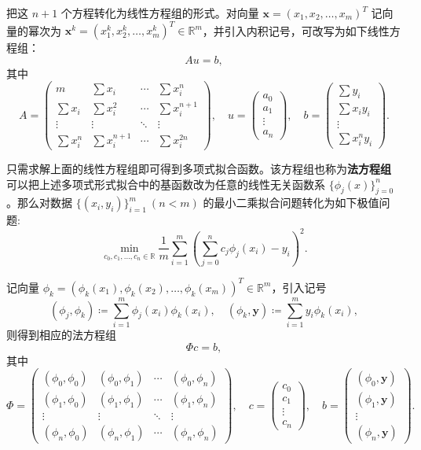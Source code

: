 \documentclass{article}
\begin{document}
把这 \(n + 1\) 个方程转化为线性方程组的形式。对向量 \(\bm{x} = (x_{1},x_{2},\dots ,x_{m})^{T}\) 记向量的幂次为 \(\bm{x}^{k} = (x_{1}^{k},x_{2}^{k},\dots ,x_{m}^{k})^{T}\in \mathbb{R}^{m}\)，并引入内积记号，可改写为如下线性方程组：
\[
A u = b,
\]
其中
\[
A = \begin{pmatrix}
m & \sum x_{i} & \cdots & \sum x_{i}^{n} \\
\sum x_{i} & \sum x_{i}^{2} & \cdots & \sum x_{i}^{n+1} \\
\vdots & \vdots & \ddots & \vdots \\
\sum x_{i}^{n} & \sum x_{i}^{n+1} & \cdots & \sum x_{i}^{2n}
\end{pmatrix},
\quad
u = \begin{pmatrix}
a_{0} \\ a_{1} \\ \vdots \\ a_{n}
\end{pmatrix},
\quad
b = \begin{pmatrix}
\sum y_{i} \\
\sum x_{i} y_{i} \\
\vdots \\
\sum x_{i}^{n} y_{i}
\end{pmatrix}.
\]

只需求解上面的线性方程组即可得到多项式拟合函数。该方程组也称为\textbf{法方程组}
可以把上述多项式形式拟合中的基函数改为任意的线性无关函数系 \(\{\phi_{j}(x)\}_{j = 0}^{n}\)。那么对数据 \(\{(x_{i},y_{i})\}_{i = 1}^{m}\ (n < m)\) 的最小二乘拟合问题转化为如下极值问题:
\[
\min_{c_0,c_1,\dots ,c_n\in \mathbb{R}}\frac{1}{m}\sum_{i = 1}^{m}\left(\sum_{j = 0}^{n}c_j\phi_j(x_i) - y_i\right)^2.
\]

记向量 \(\phi_{k} = (\phi_{k}(x_{1}),\phi_{k}(x_{2}),\dots ,\phi_{k}(x_{m}))^{T}\in \mathbb{R}^{m}\)，引入记号
\[
(\phi_{j},\phi_{k})\coloneqq \sum_{i = 1}^{m}\phi_{j}(x_{i})\phi_{k}(x_{i}),\quad (\phi_{k},\bm{y})\coloneqq \sum_{i = 1}^{m}y_{i}\phi_{k}(x_{i}),
\]
则得到相应的法方程组
\[
\Phi c = b,
\]
其中
\[
\Phi = \begin{pmatrix}
(\phi_{0},\phi_{0}) & (\phi_{0},\phi_{1}) & \cdots & (\phi_{0},\phi_{n}) \\
(\phi_{1},\phi_{0}) & (\phi_{1},\phi_{1}) & \cdots & (\phi_{1},\phi_{n}) \\
\vdots & \vdots & \ddots & \vdots \\
(\phi_{n},\phi_{0}) & (\phi_{n},\phi_{1}) & \cdots & (\phi_{n},\phi_{n})
\end{pmatrix},
\quad
c = \begin{pmatrix}
c_{0} \\ c_{1} \\ \vdots \\ c_{n}
\end{pmatrix},
\quad
b = \begin{pmatrix}
(\phi_{0},\bm{y}) \\
(\phi_{1},\bm{y}) \\
\vdots \\
(\phi_{n},\bm{y})
\end{pmatrix}.
\]
\end{document}
